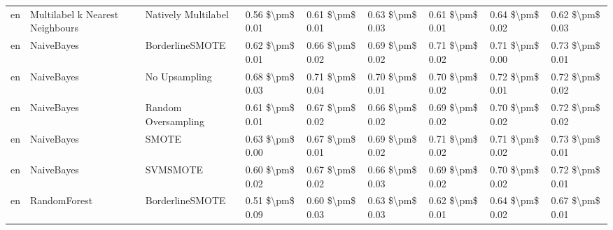 \begin{tabular}{lllllllll}
      en & Multilabel k Nearest Neighbours &           Natively Multilabel &     0.56 \$\textbackslash pm\$ 0.01 &           0.61 \$\textbackslash pm\$ 0.01 &       0.63 \$\textbackslash pm\$ 0.03 &        0.61 \$\textbackslash pm\$ 0.01 &                         0.64 \$\textbackslash pm\$ 0.02 &     0.62 \$\textbackslash pm\$ 0.03 \\
      en &                      NaiveBayes &               BorderlineSMOTE &     0.62 \$\textbackslash pm\$ 0.01 &           0.66 \$\textbackslash pm\$ 0.02 &       0.69 \$\textbackslash pm\$ 0.02 &        0.71 \$\textbackslash pm\$ 0.02 &                         0.71 \$\textbackslash pm\$ 0.00 &     0.73 \$\textbackslash pm\$ 0.01 \\
      en &                      NaiveBayes &                 No Upsampling &     0.68 \$\textbackslash pm\$ 0.03 &           0.71 \$\textbackslash pm\$ 0.04 &       0.70 \$\textbackslash pm\$ 0.01 &        0.70 \$\textbackslash pm\$ 0.02 &                         0.72 \$\textbackslash pm\$ 0.01 &     0.72 \$\textbackslash pm\$ 0.02 \\
      en &                      NaiveBayes &           Random Oversampling &     0.61 \$\textbackslash pm\$ 0.01 &           0.67 \$\textbackslash pm\$ 0.02 &       0.66 \$\textbackslash pm\$ 0.02 &        0.69 \$\textbackslash pm\$ 0.02 &                         0.70 \$\textbackslash pm\$ 0.02 &     0.72 \$\textbackslash pm\$ 0.02 \\
      en &                      NaiveBayes &                         SMOTE &     0.63 \$\textbackslash pm\$ 0.00 &           0.67 \$\textbackslash pm\$ 0.01 &       0.69 \$\textbackslash pm\$ 0.02 &        0.71 \$\textbackslash pm\$ 0.02 &                         0.71 \$\textbackslash pm\$ 0.02 &     0.73 \$\textbackslash pm\$ 0.01 \\
      en &                      NaiveBayes &                      SVMSMOTE &     0.60 \$\textbackslash pm\$ 0.02 &           0.67 \$\textbackslash pm\$ 0.02 &       0.66 \$\textbackslash pm\$ 0.03 &        0.69 \$\textbackslash pm\$ 0.02 &                         0.70 \$\textbackslash pm\$ 0.02 &     0.72 \$\textbackslash pm\$ 0.01 \\
      en &                    RandomForest &               BorderlineSMOTE &     0.51 \$\textbackslash pm\$ 0.09 &           0.60 \$\textbackslash pm\$ 0.03 &       0.63 \$\textbackslash pm\$ 0.03 &        0.62 \$\textbackslash pm\$ 0.01 &                         0.64 \$\textbackslash pm\$ 0.02 &     0.67 \$\textbackslash pm\$ 0.01 \\

\end{tabular}
